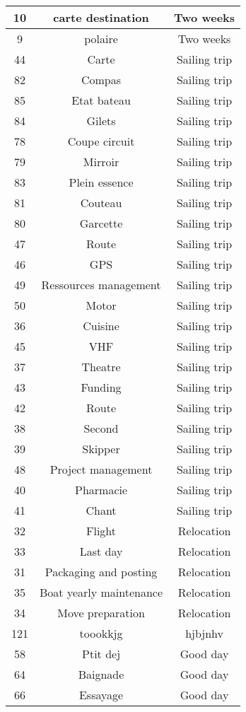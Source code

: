 \begin{longtable}{|c|c|c|}
\hline
10 & carte destination & Two weeks\\
\hline
9 & polaire & Two weeks\\
\hline
44 & Carte & Sailing trip\\
\hline
82 & Compas & Sailing trip\\
\hline
85 & Etat bateau & Sailing trip\\
\hline
84 & Gilets & Sailing trip\\
\hline
78 & Coupe circuit & Sailing trip\\
\hline
79 & Mirroir & Sailing trip\\
\hline
83 & Plein essence & Sailing trip\\
\hline
81 & Couteau  & Sailing trip\\
\hline
80 & Garcette & Sailing trip\\
\hline
47 & Route & Sailing trip\\
\hline
46 & GPS & Sailing trip\\
\hline
49 & Ressources management & Sailing trip\\
\hline
50 & Motor & Sailing trip\\
\hline
36 & Cuisine & Sailing trip\\
\hline
45 & VHF & Sailing trip\\
\hline
37 & Theatre & Sailing trip\\
\hline
43 & Funding & Sailing trip\\
\hline
42 & Route & Sailing trip\\
\hline
38 & Second & Sailing trip\\
\hline
39 & Skipper & Sailing trip\\
\hline
48 & Project management & Sailing trip\\
\hline
40 & Pharmacie & Sailing trip\\
\hline
41 & Chant & Sailing trip\\
\hline
32 & Flight & Relocation\\
\hline
33 & Last day & Relocation\\
\hline
31 & Packaging and posting & Relocation\\
\hline
35 & Boat yearly maintenance & Relocation\\
\hline
34 & Move preparation & Relocation\\
\hline
121 & toookkjg & hjbjnhv\\
\hline
58 & Ptit dej & Good day\\
\hline
64 & Baignade & Good day\\
\hline
66 & Essayage & Good day\\

\end{longtable}
